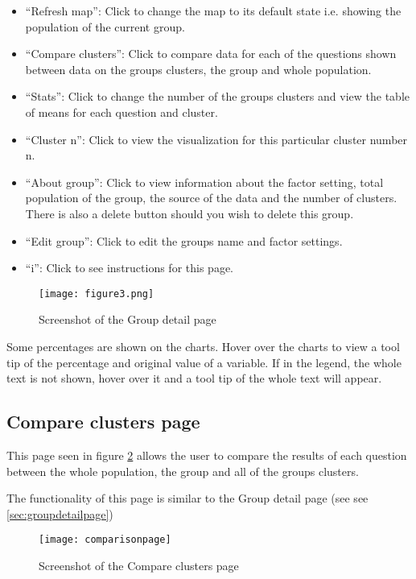 \begin{itemize}
	\item ``Refresh map'': Click to change the map to its default state i.e. showing the population of the current group.
	\item ``Compare clusters'': Click to compare data for each of the questions shown between data on the group\textsc{}s clusters, the group and whole population.
	\item ``Stats'': Click to change the number of the group\textsc{}s clusters and view the table of means for each question and cluster.
	\item ``Cluster n'': Click to view the visualization for this particular cluster number n.
	\item ``About group'': Click to view information about the factor setting, total population of the group, the source of the data and the number of clusters. There is also a delete button should you wish to delete this group.
	\item ``Edit group'': Click to edit the group\textsc{}s name and factor settings.
	\item ``i'': Click to see instructions for this page.
\end{itemize}

\begin{figure}[h]
\centering
\texttt{[image: figure3.png]}
\caption{Screenshot of the Group detail page}
\label{fig:groupdetailpage}
\end{figure}

Some percentages are shown on the charts. Hover over the charts to view a tool tip of the percentage and original value of a variable. If in the legend, the whole text is not shown, hover over it and a tool tip of the whole text will appear.

\subsection{Compare clusters page}

This page seen in figure \ref{fig:compareclusterspage} allows the user to compare the results of each question between the whole population, the group and all of the group\textsc{}s clusters. \par

The functionality of this page is similar to the Group detail page (see see \ref{sec:groupdetailpage})

\begin{figure}[h]
\centering
\texttt{[image: comparisonpage]}
\caption{Screenshot of the Compare clusters page}
\label{fig:compareclusterspage}
\end{figure}

